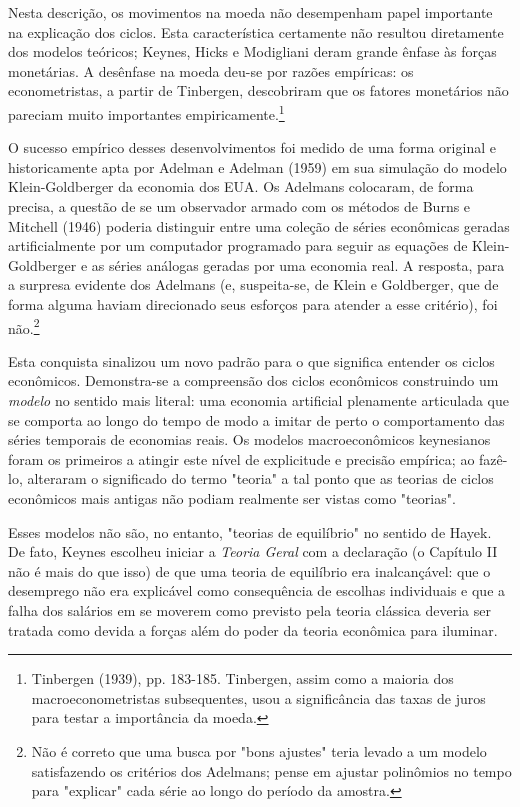 \documentclass[12pt]{article}
\begin{document}
Nesta descrição, os movimentos na moeda não desempenham papel importante na explicação dos ciclos. Esta característica certamente não resultou diretamente dos modelos teóricos; Keynes, Hicks e Modigliani deram grande ênfase às forças monetárias. A desênfase na moeda deu-se por razões empíricas: os econometristas, a partir de Tinbergen, descobriram que os fatores monetários não pareciam muito importantes empiricamente.\footnote{Tinbergen (1939), pp. 183-185. Tinbergen, assim como a maioria dos macroeconometristas subsequentes, usou a significância das taxas de juros para testar a importância da moeda.}

O sucesso empírico desses desenvolvimentos foi medido de uma forma original e historicamente apta por Adelman e Adelman (1959) em sua simulação do modelo Klein-Goldberger da economia dos EUA. Os Adelmans colocaram, de forma precisa, a questão de se um observador armado com os métodos de Burns e Mitchell (1946) poderia distinguir entre uma coleção de séries econômicas geradas artificialmente por um computador programado para seguir as equações de Klein-Goldberger e as séries análogas geradas por uma economia real. A resposta, para a surpresa evidente dos Adelmans (e, suspeita-se, de Klein e Goldberger, que de forma alguma haviam direcionado seus esforços para atender a esse critério), foi não.\footnote{Não é correto que uma busca por "bons ajustes" teria levado a um modelo satisfazendo os critérios dos Adelmans; pense em ajustar polinômios no tempo para "explicar" cada série ao longo do período da amostra.}

Esta conquista sinalizou um novo padrão para o que significa entender os ciclos econômicos. Demonstra-se a compreensão dos ciclos econômicos construindo um \textit{modelo} no sentido mais literal: uma economia artificial plenamente articulada que se comporta ao longo do tempo de modo a imitar de perto o comportamento das séries temporais de economias reais. Os modelos macroeconômicos keynesianos foram os primeiros a atingir este nível de explicitude e precisão empírica; ao fazê-lo, alteraram o significado do termo "teoria" a tal ponto que as teorias de ciclos econômicos mais antigas não podiam realmente ser vistas como "teorias".

Esses modelos não são, no entanto, "teorias de equilíbrio" no sentido de Hayek. De fato, Keynes escolheu iniciar a \textit{Teoria Geral} com a declaração (o Capítulo II não é mais do que isso) de que uma teoria de equilíbrio era inalcançável: que o desemprego não era explicável como consequência de escolhas individuais e que a falha dos salários em se moverem como previsto pela teoria clássica deveria ser tratada como devida a forças além do poder da teoria econômica para iluminar.
\end{document}
